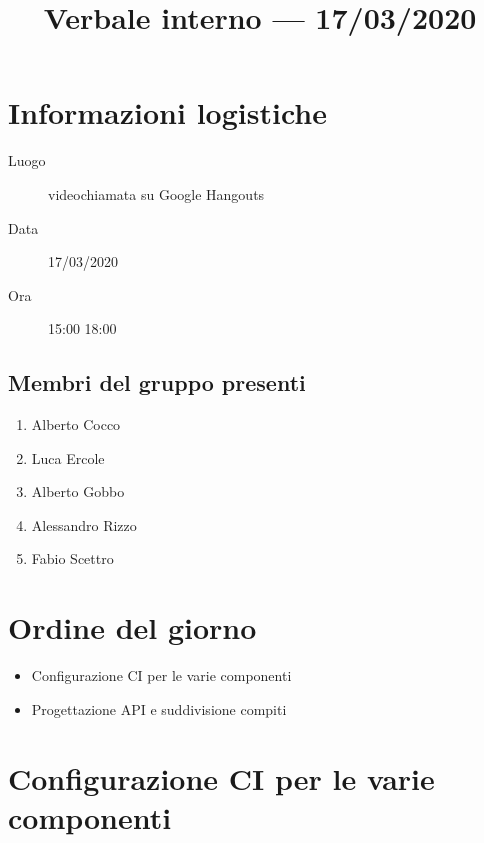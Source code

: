 \documentclass{article}
\title{Verbale interno --- 17/03/2020}
\begin{document}


\section{Informazioni logistiche}%
\label{sec:informazioni_logistiche}

\begin{description}
  \item [Luogo] videochiamata su Google Hangouts
  \item [Data] 17/03/2020
  \item [Ora] 15:00  18:00
\end{description}

\subsection{Membri del gruppo presenti}%
\label{sub:membri_del_gruppo_presenti}

\begin{enumerate}
  \item Alberto Cocco
  \item Luca Ercole
  \item Alberto Gobbo
  \item Alessandro Rizzo
  \item Fabio Scettro
\end{enumerate}

\section{Ordine del giorno}%
\label{sec:ordine_del_giorno}

\begin{itemize}
  \item Configurazione CI per le varie componenti
  \item Progettazione API e suddivisione compiti
\end{itemize}

\section{Configurazione CI per le varie componenti}%
\label{sec:configurazione_ci_per_le_varie_componenti}
\end{document}
